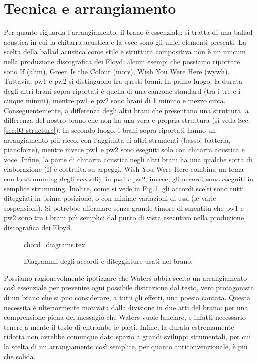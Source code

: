 \documentclass[class=book, crop=false, oneside, 12pt]{standalone}
\begin{document}
    \section{Tecnica e arrangiamento}
    \label{sec:03-arrangement}
    Per quanto riguarda l'arrangiamento, il brano è essenziale: si tratta di una ballad acustica in cui la chitarra acustica e la voce sono gli unici elementi presenti. La scelta della ballad acustica come stile e struttura compositiva non è un unicum nella produzione discografica dei Floyd: alcuni esempi che possiamo riportare sono If (\acrshort{ahm}), Green Is the Colour (\acrshort{more}), Wish You Were Here (\acrshort{wywh}). Tuttavia, \acrshort{pw1} e \acrshort{pw2} si distinguono fra questi brani. In primo luogo, la durata degli altri brani sopra riportati è quella di una canzone standard (tra i tre e i cinque minuti), mentre \acrshort{pw1} e \acrshort{pw2} sono brani di 1 minuto e mezzo circa. Conseguentemente, a differenza  degli altri brani che presentano una struttura, a differenza del nostro brano che non ha una vera e propria struttura (si veda Sec.\ref{sec:03-structure}). In secondo luogo, i brani sopra riportati hanno un arrangiamento più ricco, con l'aggiunta di altri strumenti (basso, batteria, pianoforte), mentre invece \acrshort{pw1} e \acrshort{pw2} sono eseguiti solo con chitarra acustica e voce. Infine, la parte di chitarra acustica negli altri brani ha una qualche sorta di elaborazione (If è costruita su arpeggi, Wish You Were Here combina un tema con lo strumming degli accordi); in \acrshort{pw1} e \acrshort{pw2}, invece, gli accordi sono eseguiti in semplice strumming. Inoltre, come si vede in Fig.\ref{fig:03-chords}, gli accordi scelti sono tutti diteggiati in prima posizione, o con minime variazioni di essi (le varie sospensioni). Si potrebbe affermare senza grande timore di smentita che \acrshort{pw1} e \acrshort{pw2} sono tra i brani più semplici dal punto di vista esecutivo nella produzione discografica dei Floyd.
    
    \begin{figure}
        {chord_diagrams.tex}
        \caption{Diagrammi degli accordi e diteggiature usati nel brano.}
        \label{fig:03-chords}
    \end{figure}

    Possiamo ragionevolmente ipotizzare che Waters abbia scelto un arrangiamento così essenziale per prevenire ogni possibile distrazione dal testo, vero protagonista di un brano che si puo considerare, a tutti gli effetti, una poesia cantata. Questa necessita è ulteriormente motivata dalla divisione in due atti del brano: per una comprensione piena del messagio che Waters vuole lanciare, e infatti necessario tenere a mente il testo di entrambe le parti. Infine, la durata estremamente ridotta non avrebbe comunque dato spazio a grandi sviluppi strumentali, per cui la scelta di un arrangiamento così semplice, per quanto anticonvenzionale, è più che solida. 
\end{document}
